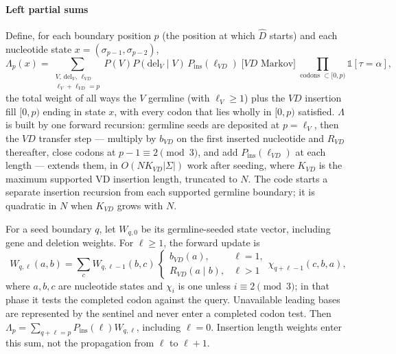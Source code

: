 \documentclass[11pt]{article}
\theoremstyle{oldplain}
\theoremstyle{oldrem}
\newcommand{\ins}{\mathrm{ins}}
\newcommand{\del}{\mathrm{del}}
\newcommand{\indic}{\mathds{1}}
\begin{document}
\paragraph{Left partial sums} Define, for each boundary position $p$ (the position at which $\hat D$
starts) and each nucleotide state $x=(\sigma_{p-1},\sigma_{p-2})$,
\begin{equation}\label{eq:lambda}
  \Lambda_p(x)=\!\!\sum_{\substack{V,\,\del_V,\,\ell_{VD}\\ \ell_V+\ell_{VD}=p}}\!\!
    P(V)P(\del_V\mid V)\,P_{\ins}(\ell_{VD})\;\bigl[\text{$VD$ Markov}\bigr]\;
    \prod_{\text{codons }\subset[0,p)}\!\!\indic[\tau=\alpha],
\end{equation}
the total weight of all ways the $V$ germline (with $\ell_V\ge1$) plus the $VD$ insertion fill
$[0,p)$ ending in state $x$, with every codon that lies wholly in $[0,p)$ satisfied. $\Lambda$ is built
by one forward recursion: germline seeds are deposited at $p=\ell_V$, then the $VD$ transfer step
--- multiply by $b_{VD}$ on the first inserted nucleotide and $R_{VD}$ thereafter, close codons at
$p-1\equiv2\pmod3$, and add $P_{\ins}(\ell_{VD})$ at each length --- extends them, in $O(NK_{VD}|\Sigma|)$ work after seeding, where $K_{VD}$ is the
maximum supported VD insertion length, truncated to $N$.
The code starts a separate insertion recursion from each supported germline
boundary; it is quadratic in $N$ when $K_{VD}$ grows with $N$.

For a seed boundary $q$, let $W_{q,0}$ be its germline-seeded state vector,
including gene and deletion weights. For $\ell\ge1$, the forward update is
\begin{equation}\label{eq:forward}
 W_{q,\ell}(a,b)=\sum_{c}W_{q,\ell-1}(b,c)\,
 \begin{cases}b_{VD}(a),&\ell=1,\\R_{VD}(a\mid b),&\ell>1\end{cases}
 \chi_{q+\ell-1}(c,b,a),
\end{equation}
where $a,b,c$ are nucleotide states and $\chi_i$ is one unless $i\equiv2\pmod3$;
in that phase it tests the completed codon against the query.
Unavailable leading bases are represented by the sentinel and never enter a
completed codon test.
Then $\Lambda_p=\sum_{q+\ell=p}P_{\ins}(\ell)W_{q,\ell}$, including $\ell=0$.
Insertion length weights enter this sum, not the propagation from $\ell$ to $\ell+1$.
\end{document}
